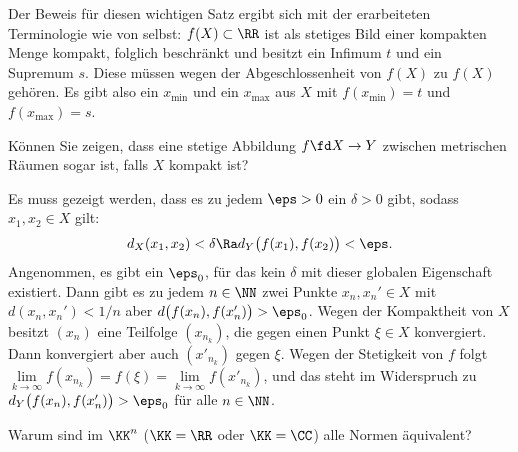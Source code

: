 \begin{antwort} 
  Der Beweis für diesen wichtigen Satz ergibt sich mit der erarbeiteten 
  Terminologie wie von selbst: 
  $f(X)\subset \RR$ ist als stetiges Bild einer kompakten Menge kompakt, 
  folglich beschränkt und besitzt ein Infimum $t$ und ein Supremum $s$. 
  Diese müssen wegen der Abgeschlossenheit von $f(X)$ zu $f(X)$ gehören. 
  Es gibt also ein $x_{\min}$ und ein $x_{\max}$ aus $X$ mit 
  $f(x_{\min})=t$ und $f(x_{\max})=s$.\AntEnd   
\end{antwort}

\begin{frage}\label{09_glmstet}
  Können Sie zeigen, dass eine stetige Abbildung 
  $f\fd X\to Y$ zwischen metrischen Räumen sogar 
   ist, falls $X$ kompakt ist?
\end{frage}

\begin{antwort}
  
  Es muss gezeigt werden, 
  dass es zu jedem $\eps>0$ ein $\delta>0$ gibt, 
  sodass  
  $x_1,x_2 \in X$ gilt:
  \[
  d_X (x_1, x_2 ) < \delta \Ra d_Y \big( f(x_1), f(x_2) \big) < \eps.
  \]
  Angenommen, es gibt ein $\eps_0$, für das kein 
  $\delta$ mit dieser globalen Eigenschaft existiert. Dann gibt es zu jedem 
  $n\in \NN$ zwei Punkte $x_n, x_n' \in X$ mit 
  $d(x_n,x_n') < 1/n$ aber $d\big( f(x_n), f(x_n') \big) > \eps_0$. 
  Wegen der Kompaktheit von $X$ besitzt $(x_n)$ eine  
  Teilfolge $(x_{n_k})$, die gegen einen Punkt $\xi \in X$ konvergiert. 
  Dann konvergiert aber auch $( x'_{n_k} )$ gegen $\xi$. 
  Wegen der Stetigkeit von $f$ folgt 
  $\lim\limits_{ k\to \infty } f(x_{n_k}) =f(\xi) =
  \lim\limits_{ k\to \infty } f(x'_{n_k}) $, 
  und das steht im Widerspruch zu 
  $d_Y\big( f(x_n), f(x_n') \big) > \eps_0$ für alle $n\in \NN$. 
  \AntEnd
\end{antwort}

\begin{frage}\label{09_normaq}
  Warum sind im $\KK^n$ ($\KK=\RR$ oder $\KK=\CC$) alle Normen äquivalent?
\end{frage}

